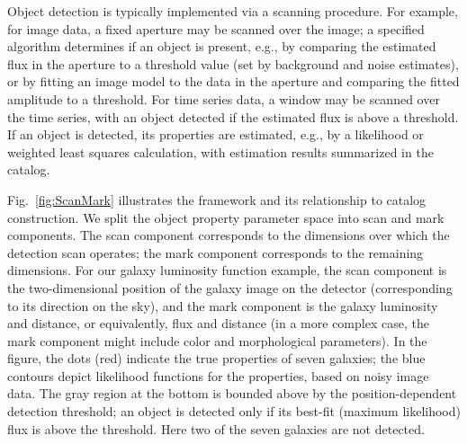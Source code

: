 Object detection is typically implemented via a scanning procedure.
For example, for image data, a fixed aperture may be scanned over the image; a specified algorithm determines if an object is present, e.g., by comparing the estimated flux in the aperture to a threshold value (set by background and noise estimates), or by fitting an image model to the data in the aperture and comparing the fitted amplitude to a threshold.
For time series data, a window may be scanned over the time series, with an object detected if the estimated flux is above a threshold.
If an object is detected, its properties are estimated, e.g., by a likelihood or weighted least squares calculation, with estimation results summarized in the catalog.

Fig.~\ref{fig:ScanMark} illustrates the framework and its relationship to catalog construction.
We split the object property parameter space into scan and mark components.
The scan component corresponds to the dimensions over which the detection scan operates; 
the mark component corresponds to the remaining dimensions.
For our galaxy luminosity function example, the scan component is the two-dimensional position of the galaxy image on the detector (corresponding to its direction on the sky), and the mark component is the galaxy luminosity and distance, or equivalently, flux and distance (in a more complex case, the mark component might include color and morphological parameters).
In the figure, the dots (red) indicate the true properties of seven galaxies; the blue contours depict likelihood functions for the properties, based on noisy image data.
The gray region at the bottom is bounded above by the position-dependent detection threshold; an object is detected only if its best-fit (maximum likelihood) flux is above the threshold.
Here two of the seven galaxies are not detected.

